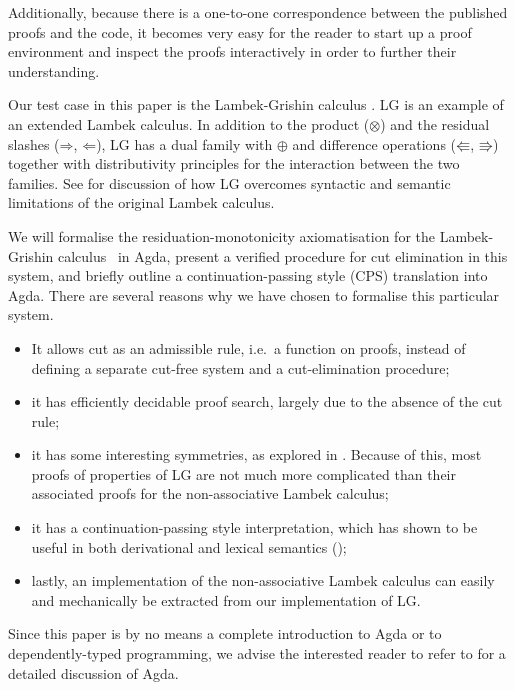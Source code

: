\documentclass[twocolumn]{llncs}
\newcommand{\Varid}[1]{\mathit{#1}}
\renewcommand\Varid[1]{\mathord{\textsf{#1}}}
\begin{document}
Additionally, because there is a one-to-one correspondence between the
published proofs and the code, it becomes very easy for the reader to
start up a proof environment and inspect the proofs interactively in
order to further their understanding.


Our test case in this paper is the Lambek-Grishin calculus \citep[LG,
][]{moortgat2009}. LG is an example of an extended Lambek calculus. In
addition to the product (\ensuremath{\Varid{⊗}}) and the residual slashes (\ensuremath{\Varid{⇒}}, \ensuremath{\Varid{⇐}}), LG
has a dual family with \ensuremath{\Varid{⊕}} and difference operations (\ensuremath{\Varid{⇚}}, \ensuremath{\Varid{⇛}})
together with distributivity principles for the interaction between
the two families. See \citet{moortgat2009} for discussion of how LG
overcomes syntactic and semantic limitations of the original Lambek
calculus.

We will formalise the residuation-monotonicity axiomatisation for the
Lambek-Grishin calculus~\citep{moortgat2007} in Agda, present a
verified procedure for cut elimination in this system, and briefly
outline a continuation-passing style (CPS) translation into
Agda. There are several reasons why we have chosen to formalise this
particular system.
\begin{itemize}
\item%
  It allows cut as an admissible rule, i.e.\ a function on proofs,
  instead of defining a separate cut-free system and a cut-elimination
  procedure;
\item%
  it has efficiently decidable proof search, largely due to the
  absence of the cut rule;
\item%
  it has some interesting symmetries, as explored in
  \citet{moortgat2007,moortgat2009}. Because of this, most proofs of
  properties of LG are not much more complicated than their associated
  proofs for the non-associative Lambek calculus;
\item
  it has a continuation-passing style interpretation, which has shown to
  be useful in both derivational and lexical semantics
  (\citeauthor{moortgat2007,bs2015,asher2011});
\item%
  lastly, an implementation of the non-associative Lambek calculus can
  easily and mechanically be extracted from our implementation of LG.
\end{itemize}
Since this paper is by no means a complete introduction to Agda or to
dependently-typed programming, we advise the interested reader to
refer to \citet{norell2009} for a detailed discussion of Agda.
\end{document}
